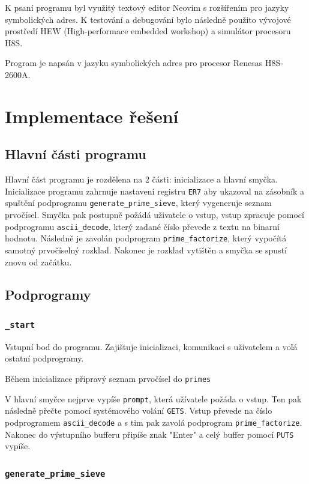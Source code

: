 \documentclass[12pt]{article}
\newcommand{\code}[1]{\mbox{\texttt{#1}}}
\begin{document}
K psaní programu byl využitý textový editor Neovim s rozšířením pro jazyky symbolických
adres. K testování a debugování bylo následně použito vývojové prostředí HEW (High-performace
embedded workshop) a simulátor procesoru H8S.

Program je napsán v jazyku symbolických adres pro procesor Renesas H8S-2600A.

\section{Implementace řešení}

\subsection{Hlavní části programu}

Hlavní část programu je rozdělena na 2 části: inicializace a hlavní smyčka. Inicializace programu
zahrnuje nastavení registru \code{ER7} aby ukazoval na zásobník a spuštění podprogramu
\code{generate\_prime\_sieve}, který vygeneruje seznam prvočísel. Smyčka pak postupně požádá
uživatele o vstup, vstup zpracuje pomocí podprogramu \code{ascii\_decode}, který zadané číslo
převede z textu na binarní hodnotu. Následně je zavolán podprogram \code{prime\_factorize}, který
vypočítá samotný prvočíselný rozklad. Nakonec je rozklad vytištěn a smyčka se spustí znovu od
začátku.

\subsection{Podprogramy}

\subsubsection{\code{\_start}}

Vstupní bod do programu. Zajištuje inicializaci, komunikaci s uživatelem a volá ostatní
podprogramy.

Během inicializace připravý seznam prvočísel do \code{primes}

V hlavní smyčce nejprve vypíše \code{prompt}, která užívatele požáda o vstup. Ten pak následně
přečte pomocí systémového volání \code{GETS}. Vstup převede na číslo podprogramem
\code{ascii\_decode} a s tim pak zavolá podprogram \code{prime\_factorize}. Nakonec do výstupního
bufferu připíše znak "Enter" a celý buffer pomocí \code{PUTS} vypíše.

\subsubsection{\code{generate\_prime\_sieve}}
\end{document}

